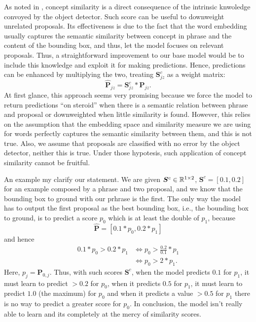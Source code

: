 As noted in \cite{chen2018knowledge}, concept similarity is a direct
consequence of the intrinsic knwoledge convoyed by the object
detector. Such score can be useful to downweight unrelated proposals.
Its effectiveness is due to the fact that the word embedding usually
captures the semantic similarity between concept in phrase and the
content of the bounding box, and thus, let the model focuses on
relevant proposals. Thus, a straightforward improvement to our base
model would be to include this knowledge and exploit it for making
predictions. Hence, predictions can be enhanced by multiplying the
two, treating $\bm{S}^c_{jz}$ as a weight matrix:
\begin{equation}
  \bm{\hat{P}}_{jz} = \bm{S}^c_{jz} * \bm{P}_{jz}.
\end{equation}
At first glance, this approach seems very promising because we force
the model to return predictions ``on steroid'' when there is a
semantic relation between phrase and proposal or downweighted when
little similarity is found. However, this relies on the assumption
that the embedding space and similarity measure we are using for words
perfectly captures the semantic similarity between them, and this is
not true. Also, we assume that proposals are classified with no error
by the object detector, neither this is true. Under those hypotesis,
such application of concept similarity cannot be fruitful. 

An example my clarify our statement. We are given $\bm{S}^c \in
\mathbb{R}^{1 \times 2}$, $\bm{S}^c = [0.1, 0.2]$ for an example composed by a
phrase and two proposal, and we know that the bounding box to ground
with our prhrase is the first. The only way the model has to output
the first proposal as the best bounding box, i.e., the bounding box to
ground, is to predict a score $p_{0}$ which is at least the double of
$p_{1}$, because
\begin{equation}
  \bm{\hat{P}} = [0.1 * p_{0}, 0.2 * p_{1}]
\end{equation}
and hence
\begin{equation}
\begin{split}
0.1 * p_{0} > 0.2 * p_{1} & \iff p_{0} >  \frac{0.2}{0.1} * p_{1} \\
  & \iff p_{0} > 2 * p_{1}.
\end{split}
\end{equation}
Here, $p_{j} = \bm{P}_{0,j}$. Thus, with such scores $\bm{S}^c$, when
the model predicts $0.1$ for $p_1$, it must learn to predict $> 0.2$
for $p_0$, when it predicts $0.5$ for $p_1$, it must learn to predict
$1.0$ (the maximum) for $p_0$ and when it predicts a value $> 0.5$ for
$p_1$ there is no way to predict a greater score for $p_0$. In
conclusion, the model isn't really able to learn and its completely at
the mercy of similarity scores.

